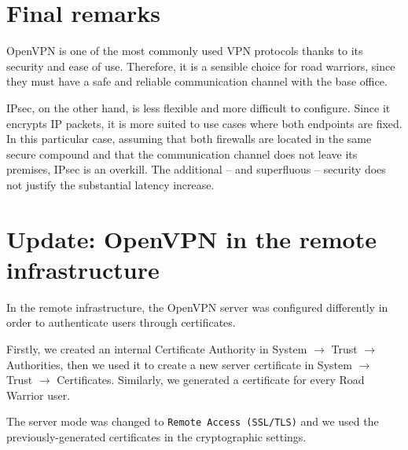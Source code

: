\documentclass{homework}
\begin{document}
    
    \section{Final remarks}
    OpenVPN is one of the most commonly used VPN protocols thanks to its security and ease of use.
    Therefore, it is a sensible choice for road warriors, since they must have a safe and reliable communication channel with the base office.
    
    IPsec, on the other hand, is less flexible and more difficult to configure.
    Since it encrypts IP packets, it is more suited to use cases where both endpoints are fixed.
    In this particular case, assuming that both firewalls are located in the same secure compound and that the communication channel does not leave its premises, IPsec is an overkill.
    The additional -- and superfluous -- security does not justify the substantial latency increase.
    
    \section{Update: OpenVPN in the remote infrastructure}
    In the remote infrastructure, the OpenVPN server was configured differently in order to authenticate users through certificates.
    
    Firstly, we created an internal Certificate Authority in System $\rightarrow$ Trust $\rightarrow$ Authorities, then we used it to create a new server certificate in System $\rightarrow$ Trust $\rightarrow$ Certificates.
    Similarly, we generated a certificate for every Road Warrior user.
    
    The server mode was changed to \texttt{Remote Access (SSL/TLS)} and we used the previously-generated certificates in the cryptographic settings. 
\end{document}
